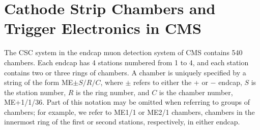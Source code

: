 \section{Cathode Strip Chambers and Trigger Electronics in CMS}
\label{sec:csc_electronics}

The CSC system in the endcap muon detection system of CMS \cite{Acosta:2002km} contains 540 chambers. Each endcap has 4 stations numbered from 1 to 4, and each station contains two or three rings of chambers. A chamber is uniquely specified by a string of the form ME$\pm S/R/C$, where $\pm$ refers to either the + or $-$ endcap, $S$ is the station number, $R$ is the ring number, and $C$ is the chamber number, \eg ME+1/1/36. Part of this notation may be omitted when referring to groups of chambers; for example, we refer to ME1/1 or ME2/1 chambers, \ie chambers in the innermost ring of the first or second stations, respectively, in either endcap.

